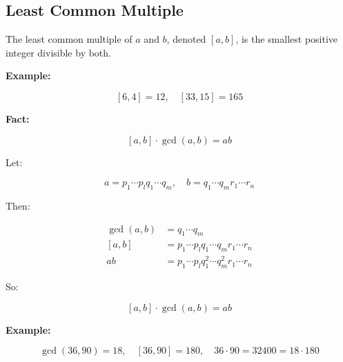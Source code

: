 \QED

\subsection{Least Common Multiple}

The least common multiple of \(a\) and \(b\), denoted \([a, b]\), is the smallest positive integer 
divisible by both.

\textbf{Example:}

\[
	[6, 4] = 12, \quad [33, 15] = 165
\]

\textbf{Fact:}

\[
	[a, b] \cdot \gcd(a, b) = ab
\]

Let:

\[
	a = p_1 \cdots p_lq_1 \cdots q_m, \quad b = q_1 \cdots q_mr_1 \cdots r_n
\]

Then:

\begin{align*}
	\gcd(a, b) & = q_1 \cdots q_m                                 \\
	[a, b]     & = p_1 \cdots p_lq_1 \cdots q_mr_1 \cdots r_n     \\
	ab         & = p_1 \cdots p_lq_1^2 \cdots q_m^2r_1 \cdots r_n
\end{align*}

So:

\[
	[a, b] \cdot \gcd(a, b) = ab
\]

\textbf{Example:}

\[
	\gcd(36, 90) = 18, \quad [36, 90] = 180, \quad 36 \cdot 90 = 32400 = 18 \cdot 180
\]
